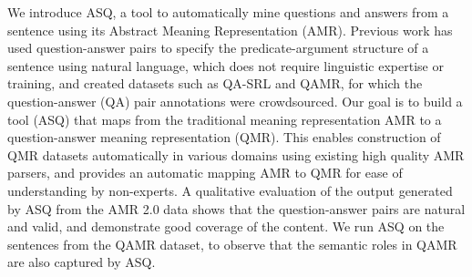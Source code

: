 We introduce ASQ, a tool to automatically mine questions and answers from a sentence using its Abstract Meaning Representation (AMR). Previous work has used question-answer pairs to specify the predicate-argument structure of a sentence using natural language, which does not require linguistic expertise or training, and created datasets such as QA-SRL and QAMR, for which the question-answer (QA) pair annotations were crowdsourced. Our goal is to build a tool (ASQ) that maps from the traditional meaning representation AMR to a question-answer meaning representation (QMR). This enables construction of QMR datasets automatically in various domains using existing high quality AMR parsers, and provides an automatic mapping AMR to QMR for ease of understanding by non-experts. A qualitative evaluation of the output generated by ASQ from the AMR 2.0 data shows that the question-answer pairs are natural and valid, and demonstrate good coverage of the content. We run ASQ on the sentences from the QAMR dataset, to observe that the semantic roles in QAMR are also captured by ASQ.
